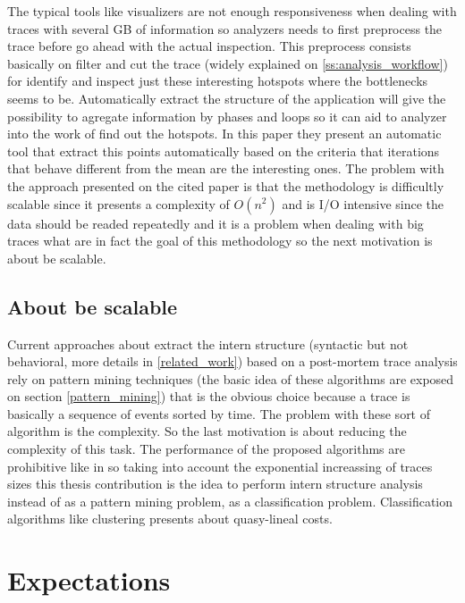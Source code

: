 The typical tools like visualizers are not enough responsiveness when dealing
with traces with several GB of information so analyzers needs to first
preprocess the trace before go ahead with the actual inspection. This preprocess
consists basically on filter and cut the trace (widely explained on
\ref{ss:analysis_workflow}) for identify and inspect just these interesting 
hotspots where the bottlenecks seems to be. Automatically extract the structure
of the application will give the possibility to agregate information by phases
and loops so it can aid to analyzer into the work of find out the
hotspots. In this paper \cite{trahay2015selecting} they present an automatic
tool that extract this points automatically based on the criteria that
iterations that behave different from the mean are the interesting ones. The
problem with the approach presented on the cited paper is that the methodology
is difficultly scalable since it presents a complexity of $O(n^2)$ and is I/O
intensive since the data should be readed repeatedly and it is a problem
when dealing with big traces what are in fact the goal of this methodology so
the next motivation is about be scalable.

\subsection{About be scalable}

Current approaches about extract the intern structure (syntactic but not
behavioral, more details in \ref{related_work}) based on a post-mortem trace
analysis rely on pattern mining techniques (the basic idea of these algorithms 
are exposed on section \ref{pattern_mining}) that is the obvious choice because 
a trace is basically a sequence of events sorted by time. The problem with these 
sort of algorithm is the complexity. So the last motivation is about reducing the 
complexity of this task. The performance of the proposed algorithms are
prohibitive like in \cite{trahay2015selecting} \cite{Safyallah2006}
\cite{Lopez-Cueva2012} so taking into account the exponential increassing of 
traces sizes this thesis contribution is the idea to perform intern structure 
analysis instead of as a pattern mining problem, as a classification problem. 
Classification algorithms like clustering presents about quasy-lineal costs.


\section{Expectations}

